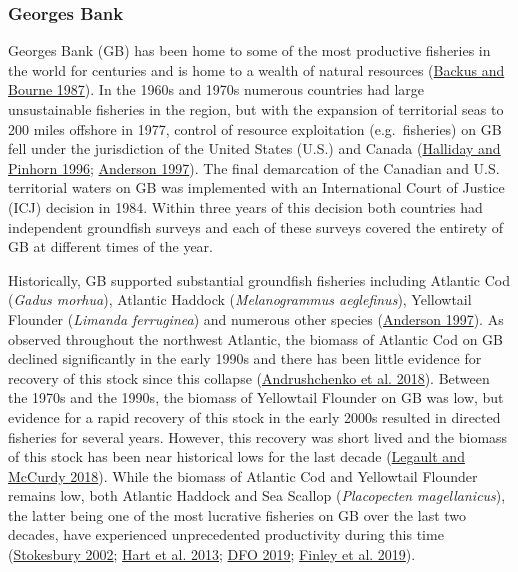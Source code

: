 \documentclass[
]{article}
\begin{document}
\hypertarget{georges-bank}{%
\subsubsection{Georges Bank}\label{georges-bank}}

Georges Bank (GB) has been home to some of the most productive fisheries in the world for centuries and is home to a wealth of natural resources (\protect\hyperlink{ref-backusGeorgesBank1987}{Backus and Bourne 1987}). In the 1960s and 1970s numerous countries had large unsustainable fisheries in the region, but with the expansion of territorial seas to 200 miles offshore in 1977, control of resource exploitation (e.g.~fisheries) on GB fell under the jurisdiction of the United States (U.S.) and Canada (\protect\hyperlink{ref-hallidayNorthAtlanticFishery1996}{Halliday and Pinhorn 1996}; \protect\hyperlink{ref-andersonHistoryFisheriesManagement1997}{Anderson 1997}). The final demarcation of the Canadian and U.S. territorial waters on GB was implemented with an International Court of Justice (ICJ) decision in 1984. Within three years of this decision both countries had independent groundfish surveys and each of these surveys covered the entirety of GB at different times of the year.

Historically, GB supported substantial groundfish fisheries including Atlantic Cod (\emph{Gadus morhua}), Atlantic Haddock (\emph{Melanogrammus aeglefinus}), Yellowtail Flounder (\emph{Limanda ferruginea}) and numerous other species (\protect\hyperlink{ref-andersonHistoryFisheriesManagement1997}{Anderson 1997}). As observed throughout the northwest Atlantic, the biomass of Atlantic Cod on GB declined significantly in the early 1990s and there has been little evidence for recovery of this stock since this collapse (\protect\hyperlink{ref-andrushchenkoAssessmentEasternGeorges2018}{Andrushchenko et al. 2018}). Between the 1970s and the 1990s, the biomass of Yellowtail Flounder on GB was low, but evidence for a rapid recovery of this stock in the early 2000s resulted in directed fisheries for several years. However, this recovery was short lived and the biomass of this stock has been near historical lows for the last decade (\protect\hyperlink{ref-legaultStockAssessmentGeorges2018}{Legault and McCurdy 2018}). While the biomass of Atlantic Cod and Yellowtail Flounder remains low, both Atlantic Haddock and Sea Scallop (\emph{Placopecten magellanicus}), the latter being one of the most lucrative fisheries on GB over the last two decades, have experienced unprecedented productivity during this time (\protect\hyperlink{ref-stokesburyEstimationSeaScallop2002}{Stokesbury 2002}; \protect\hyperlink{ref-hartSplitNotSplit2013}{Hart et al. 2013}; \protect\hyperlink{ref-dfoStockStatusUpdate2019a}{DFO 2019}; \protect\hyperlink{ref-finleyAssessmentHaddockEastern2019}{Finley et al. 2019}).
\end{document}
